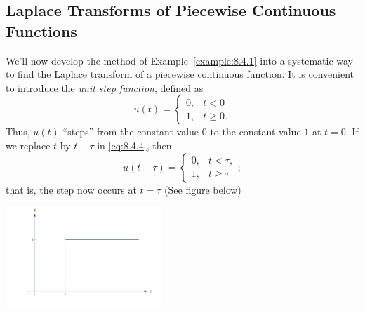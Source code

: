 \documentclass{ximera}
\begin{document}

\subsection*{Laplace Transforms of Piecewise Continuous Functions}

We'll now develop the method of Example~\ref{example:8.4.1} into a
systematic way to find the Laplace transform of a piecewise continuous
function. It is convenient to introduce the \textit{unit step
function}, defined as
\begin{equation}\label{eq:8.4.4}
u(t)=\left\{\begin{array}{rl}
0,&t<0\\
1,&t\geq 0.
\end{array}\right.
\end{equation}
Thus, $u(t)$ ``steps'' from the constant value $0$ to the constant
value $1$ at $t=0$. If we replace $t$ by
$t-\tau$ in \eqref{eq:8.4.4}, then
$$
u(t-\tau)=\left\{\begin{array}{rl}
0,&t<\tau,\\
1,&t\geq \tau
\end{array}\right.;
$$
that is, the step now occurs at $t=\tau$ (See figure below) %

\begin{image}
 \includegraphics[height=1.5in]{fig080402.jpg}
\end{image}
\end{document}
